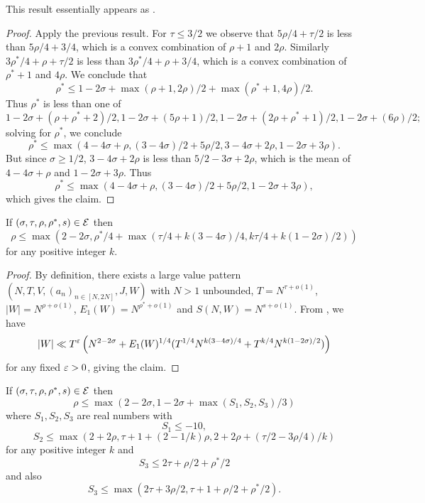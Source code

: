 This result essentially appears as \cite[Lemma 3]{heathbrown_zero_1979}.

\begin{proof} Apply the previous result.  For $\tau \leq 3/2$ we observe that $5\rho/4+\tau/2$ is less than $5\rho/4 + 3/4$, which is a convex combination of $\rho+1$ and $2\rho$.  Similarly $3\rho^*/4+\rho+\tau/2$ is less than $3\rho^*/4+\rho+3/4$, which is a convex combination of $\rho^*+1$ and $4\rho$. We conclude that
$$ \rho^* \leq  1-2\sigma + \max(\rho+1, 2\rho)/2 + \max(\rho^*+1, 4\rho)/2.$$
Thus $\rho^*$ is less than one of
$$ 1-2\sigma + (\rho+\rho^*+2)/2, 1-2\sigma + (5\rho+1)/2, 1-2\sigma + (2\rho+\rho^*+1)/2, 1-2\sigma + (6\rho)/2;$$
solving for $\rho^*$, we conclude
$$ \rho^* \leq \max( 4-4\sigma + \rho, (3-4\sigma)/2 + 5\rho/2, 3-4\sigma + 2\rho, 1-2\sigma + 3\rho).$$
But since $\sigma \geq 1/2$, $3-4\sigma + 2\rho$ is less than $5/2-3\sigma + 2\rho$, which is the mean of $4-4\sigma+\rho$ and $1-2\sigma+3\rho$. Thus
$$ \rho^* \leq \max( 4-4\sigma + \rho, (3-4\sigma)/2 + 5\rho/2, 1-2\sigma + 3\rho),$$
which gives the claim.
\end{proof}


\begin{lemma}\label{hbt-2} If $(\sigma,\tau,\rho,\rho^*,s) \in \mathcal{E}$ then
$$ \rho \leq \max( 2-2\sigma, \rho^*/4 + \max(\tau/4 + k(3-4\sigma)/4, k\tau/4 + k(1-2\sigma)/2))$$
for any positive integer $k$.
\end{lemma}

\literature
{}

\begin{proof} By definition, there exists a large value pattern $(N,T,V,(a_n)_{n \in [N,2N]},J,W)$ with $N>1$ unbounded, $T = N^{\tau+o(1)}$, $|W| = N^{\rho+o(1)}$, $E_1(W) = N^{\rho^*+o(1)}$ and $S(N,W) = N^{s+o(1)}$.   From \cite[Lemma 4]{heathbrown_zero_1979}, we have
$$ |W| \ll T^\varepsilon \left( N^{2-2\sigma} + E_1(W)^{1/4} (T^{1/4} N^{k(3-4\sigma)/4} + T^{k/4} N^{k(1-2\sigma)/2})\right)$$
for any fixed $\varepsilon>0$, giving the claim.
\end{proof}

\begin{lemma}\label{gm-1}  If $(\sigma,\tau,\rho,\rho^*,s) \in \mathcal{E}$ then
$$ \rho \leq \max(2-2\sigma, 1-2\sigma + \max(S_1, S_2, S_3)/3)$$
where $S_1, S_2, S_3$ are real numbers with
$$ S_1 \leq -10,$$
$$ S_2 \leq \max(2+2\rho, \tau+1+(2-1/k) \rho, 2 + 2\rho + (\tau/2 - 3\rho/4)/k )$$
for any positive integer $k$ and
$$ S_3 \leq 2\tau + \rho/2 + \rho^*/2$$
and also
$$ S_3 \leq \max( 2\tau + 3\rho/2, \tau+1+\rho/2+\rho^*/2).$$
\end{lemma}

